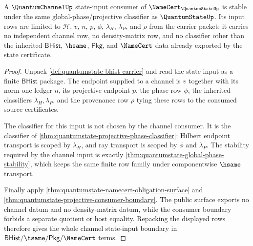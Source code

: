 \begin{theorem}
\label{thm:quantumstate-channel-consumer-input-boundary}
A $\QuantumChannelUp$ state-input consumer of
$\NameCert_{\QuantumStateUp}$ is stable under the same
global-phase/projective classifier as $\QuantumStateUp$. Its input rows are
limited to $\mathcal{H}$, $v$, $n$, $p$, $\phi$, $\lambda_H$, $\lambda_P$,
and $\rho$ from the carrier packet; it carries no independent channel row,
no density-matrix row, and no classifier other than the inherited
$\mathsf{BHist}$, $\hsame$, $\mathsf{Pkg}$, and $\NameCert$ data already
exported by the state certificate.
\end{theorem}
\begin{proof}
Unpack \autoref{def:quantumstate-bhist-carrier} and read the state input as
a finite $\mathsf{BHist}$ package. The endpoint supplied to a channel is
$v$ together with its norm-one ledger $n$, its projective endpoint $p$, the
phase row $\phi$, the inherited classifiers $\lambda_H,\lambda_P$, and the
provenance row $\rho$ tying these rows to the consumed source certificates.

The classifier for this input is not chosen by the channel consumer. It is
the classifier of \autoref{thm:quantumstate-projective-phase-classifier}:
Hilbert endpoint transport is scoped by $\lambda_H$, and ray transport is
scoped by $\phi$ and $\lambda_P$. The stability required by the channel
input is exactly \autoref{thm:quantumstate-global-phase-stability}, which
keeps the same finite row family under componentwise $\hsame$ transport.

Finally apply \autoref{thm:quantumstate-namecert-obligation-surface} and
\autoref{thm:quantumstate-projective-consumer-boundary}. The public surface
exports no channel datum and no density-matrix datum, while the consumer
boundary forbids a separate quotient or host equality. Repacking the
displayed rows therefore gives the whole channel state-input boundary in
$\mathsf{BHist}/\hsame/\mathsf{Pkg}/\NameCert$ terms.
\end{proof}

